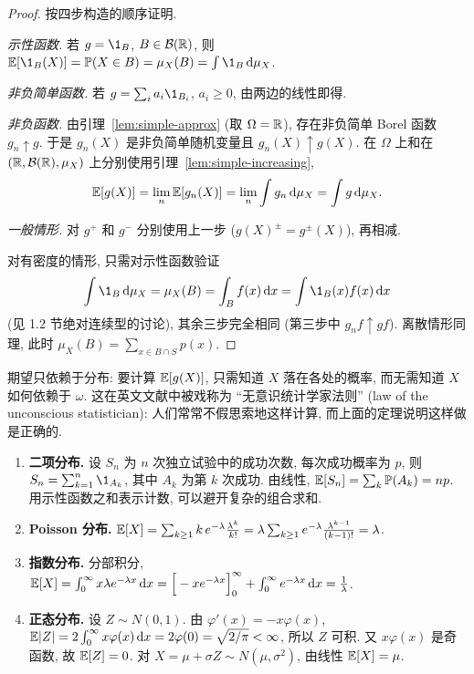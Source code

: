 \begin{proof}
按四步构造的顺序证明.

\emph{示性函数.} 若 $g=\1_B$, $B\in\mathcal{B}(\mathbb{R})$, 则 $\E[\1_B(X)]=\P(X\in B)=\mu_X(B)=\int\1_B\dd\mu_X$.

\emph{非负简单函数.} 若 $g=\sum_i a_i\1_{B_i}$, $a_i\ge0$, 由两边的线性即得.

\emph{非负函数.} 由引理~\ref{lem:simple-approx} (取 $\Omega=\mathbb{R}$), 存在非负简单 Borel 函数 $g_n\uparrow g$. 于是 $g_n(X)$ 是非负简单随机变量且 $g_n(X)\uparrow g(X)$. 在 $\Omega$ 上和在 $(\mathbb{R},\mathcal{B}(\mathbb{R}),\mu_X)$ 上分别使用引理~\ref{lem:simple-increasing},
\[
\mathbb{E}[g(X)]=\lim_n\mathbb{E}[g_n(X)]=\lim_n\int g_n\mathop{}\!\mathrm{d}\mu_X=\int g\mathop{}\!\mathrm{d}\mu_X.
\]

\emph{一般情形.} 对 $g^+$ 和 $g^-$ 分别使用上一步 ($g(X)^\pm=g^\pm(X)$), 再相减.

对有密度的情形, 只需对示性函数验证
\[
\int\1_B\dd\mu_X=\mu_X(B)=\int_B f(x)\dd x=\int\1_B(x)f(x)\dd x
\]
(见 1.2 节绝对连续型的讨论), 其余三步完全相同 (第三步中 $g_nf\uparrow gf$). 离散情形同理, 此时 $\mu_X(B)=\sum_{x\in B\cap S}p(x)$.
\end{proof}

\begin{intuition}
期望只依赖于分布: 要计算 $\mathbb{E}[g(X)]$, 只需知道 $X$ 落在各处的概率, 而无需知道 $X$ 如何依赖于 $\omega$. 这在英文文献中被戏称为 ``无意识统计学家法则'' (law of the unconscious statistician): 人们常常不假思索地这样计算, 而上面的定理说明这样做是正确的.
\end{intuition}

\begin{example}[常用分布的期望]\label{ex:means}
\begin{enumerate}
\item \textbf{二项分布.} 设 $S_n$ 为 $n$ 次独立试验中的成功次数, 每次成功概率为 $p$, 则 $S_n=\sum_{k=1}^n\1_{A_k}$, 其中 $A_k$ 为第 $k$ 次成功. 由线性, $\mathbb{E}[S_n]=\sum_k\mathbb{P}(A_k)=np$. 用示性函数之和表示计数, 可以避开复杂的组合求和.
\item \textbf{Poisson 分布.} $\mathbb{E}[X]=\sum_{k\ge1}k\,e^{-\lambda}\frac{\lambda^k}{k!}=\lambda\sum_{k\ge1}e^{-\lambda}\frac{\lambda^{k-1}}{(k-1)!}=\lambda$.
\item \textbf{指数分布.} 分部积分,
$\mathbb{E}[X]=\int_0^\infty x\lambda e^{-\lambda x}\mathop{}\!\mathrm{d} x=\Big[-xe^{-\lambda x}\Big]_0^\infty+\int_0^\infty e^{-\lambda x}\mathop{}\!\mathrm{d} x=\frac{1}{\lambda}$.
\item \textbf{正态分布.} 设 $Z\sim N(0,1)$. 由 $\varphi'(x)=-x\varphi(x)$,
$\mathbb{E}\lvert Z\rvert=2\int_0^\infty x\varphi(x)\mathop{}\!\mathrm{d} x=2\varphi(0)=\sqrt{2/\pi}<\infty$, 所以 $Z$ 可积. 又 $x\varphi(x)$ 是奇函数, 故 $\mathbb{E}[Z]=0$. 对 $X=\mu+\sigma Z\sim N(\mu,\sigma^2)$, 由线性 $\mathbb{E}[X]=\mu$.
\end{enumerate}
\end{example}

